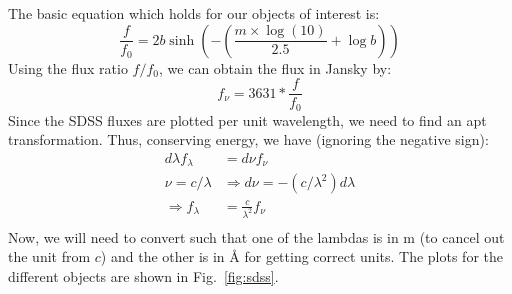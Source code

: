 \documentclass{article}
\begin{document}
The basic equation which holds for our objects of interest is:
\begin{equation}
\frac{f}{f_0} = 2b\sinh\left(-\left(\frac{m\times \log(10)}{2.5}+\log b\right)\right)
\end{equation}
Using the flux ratio $f/f_0$, we can obtain the flux in Jansky by:
$$f_\nu=3631*\frac{f}{f_0}$$
Since the SDSS fluxes are plotted per unit wavelength, we need to find an apt transformation. Thus, conserving energy, we have (ignoring the negative sign):
\begin{equation}
\begin{split}
d\lambda f_\lambda &= d\nu f_\nu \\
\nu = c/\lambda &\Rightarrow d\nu = -(c/\lambda^2)d\lambda \\
\Rightarrow f_\lambda &= \frac{c}{\lambda^2} f_\nu \\
\end{split}
\end{equation}
Now, we will need to convert such that one of the lambdas is in m (to cancel out the unit from $c$) and the other is in {\AA} for getting correct units. 
The plots for the different objects are shown in Fig.~\ref{fig:sdss}. 
\end{document}
